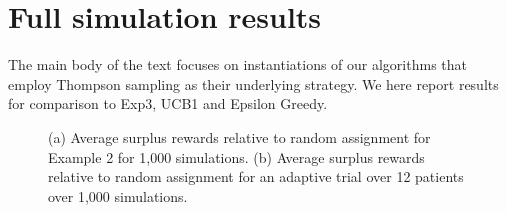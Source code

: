 \section{Full simulation results}

The main body of the text focuses on instantiations of our algorithms that employ Thompson sampling as their underlying strategy. We here report results for comparison to Exp3, UCB1 and Epsilon Greedy. 


\begin{figure*}[t]
	\centering	
	\vspace{-6mm}
	\caption{
	(a) Average surplus rewards relative to random assignment for Example 2 for 1,000 simulations. 
	(b) Average surplus rewards relative to random assignment for an adaptive trial over 12 patients over 1,000 simulations.}
\end{figure*}